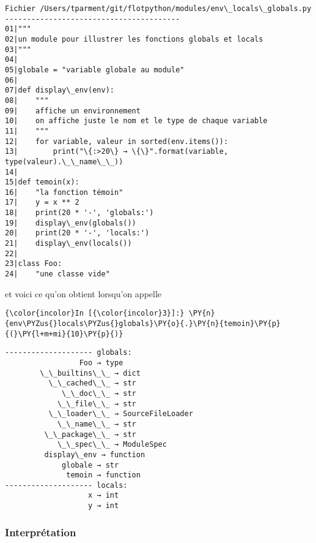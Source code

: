     \begin{Verbatim}[commandchars=\\\{\},frame=single,framerule=0.3mm,rulecolor=\color{cellframecolor}]
Fichier /Users/tparment/git/flotpython/modules/env\_locals\_globals.py
----------------------------------------
01|"""
02|un module pour illustrer les fonctions globals et locals
03|"""
04|
05|globale = "variable globale au module"
06|
07|def display\_env(env):
08|    """
09|    affiche un environnement
10|    on affiche juste le nom et le type de chaque variable
11|    """
12|    for variable, valeur in sorted(env.items()):
13|        print("\{:>20\} → \{\}".format(variable, type(valeur).\_\_name\_\_))
14|
15|def temoin(x):
16|    "la fonction témoin"
17|    y = x ** 2
18|    print(20 * '-', 'globals:')
19|    display\_env(globals())
20|    print(20 * '-', 'locals:')
21|    display\_env(locals())
22|
23|class Foo:
24|    "une classe vide"
\end{Verbatim}

    et voici ce qu'on obtient lorsqu'on appelle

    \begin{Verbatim}[commandchars=\\\{\},frame=single,framerule=0.3mm,rulecolor=\color{cellframecolor}]
{\color{incolor}In [{\color{incolor}3}]:} \PY{n}{env\PYZus{}locals\PYZus{}globals}\PY{o}{.}\PY{n}{temoin}\PY{p}{(}\PY{l+m+mi}{10}\PY{p}{)}
\end{Verbatim}


    \begin{Verbatim}[commandchars=\\\{\},frame=single,framerule=0.3mm,rulecolor=\color{cellframecolor}]
-------------------- globals:
                 Foo → type
        \_\_builtins\_\_ → dict
          \_\_cached\_\_ → str
             \_\_doc\_\_ → str
            \_\_file\_\_ → str
          \_\_loader\_\_ → SourceFileLoader
            \_\_name\_\_ → str
         \_\_package\_\_ → str
            \_\_spec\_\_ → ModuleSpec
         display\_env → function
             globale → str
              temoin → function
-------------------- locals:
                   x → int
                   y → int
\end{Verbatim}

    \hypertarget{interpruxe9tation}{%
\subsubsection{Interprétation}\label{interpruxe9tation}}

